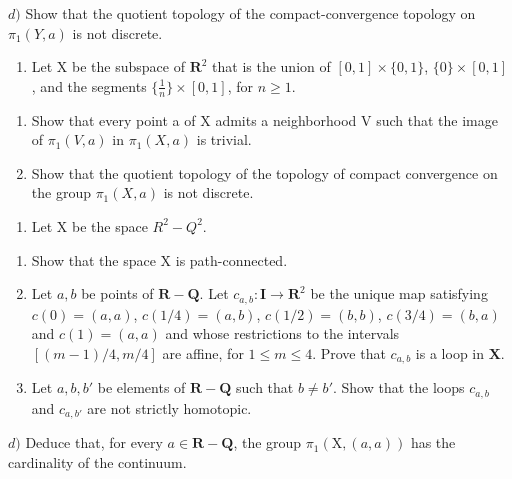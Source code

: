 \(d)\) Show that the quotient topology of the compact-convergence topology on \(\pi_1(Y,a)\) is not discrete.

\begin{enumerate}
\def\labelenumi{\arabic{enumi})}
\setcounter{enumi}{4}
\tightlist
\item
  Let X be the subspace of \(\mathbf{R}^2\) that is the union of \([0,1] \times \{0,1\}\), \(\{0\} \times [0,1]\), and the segments \(\{\frac{1}{n}\} \times [0,1]\), for \(n \geqslant 1\).
\end{enumerate}

\begin{enumerate}
\def\labelenumi{\alph{enumi})}
\item
  Show that every point a of X admits a neighborhood V such that the image of \(\pi_{1}(V,a)\) in \(\pi_{1}(X,a)\) is trivial.
\item
  Show that the quotient topology of the topology of compact convergence on the group \(\pi_{1}(X,a)\) is not discrete.
\end{enumerate}

\begin{enumerate}
\def\labelenumi{\arabic{enumi})}
\setcounter{enumi}{5}
\tightlist
\item
  Let X be the space \(R^{2}-Q^{2}\).
\end{enumerate}

\begin{enumerate}
\def\labelenumi{\alph{enumi})}
\item
  Show that the space X is path-connected.
\item
  Let \(a, b\) be points of \(\mathbf{R} - \mathbf{Q}\). Let \(c_{a,b}: \mathbf{I} \to \mathbf{R}^2\) be the unique map satisfying \(c(0) = (a, a)\), \(c(1/4) = (a, b)\), \(c(1/2) = (b, b)\), \(c(3/4) = (b, a)\) and \(c(1) = (a, a)\) and whose restrictions to the intervals \([(m-1)/4, m/4]\) are affine, for \(1 \leqslant m \leqslant 4\). Prove that \(c_{a,b}\) is a loop in \(\mathbf{X}\).
\item
  Let \(a, b, b'\) be elements of \(\mathbf{R} - \mathbf{Q}\) such that \(b \neq b'\). Show that the loops \(c_{a,b}\) and \(c_{a,b'}\) are not strictly homotopic.
\end{enumerate}

\(d)\) Deduce that, for every \(a \in \mathbf{R} - \mathbf{Q}\), the group \(\pi_1(\mathrm{X}, (a, a))\) has the cardinality of the continuum.
\relax{}
